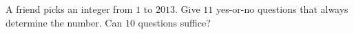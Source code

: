 A friend picks an integer from $1$ to $2013$. Give $11$ yes-or-no questions that always determine the number. Can $10$ questions suffice?
